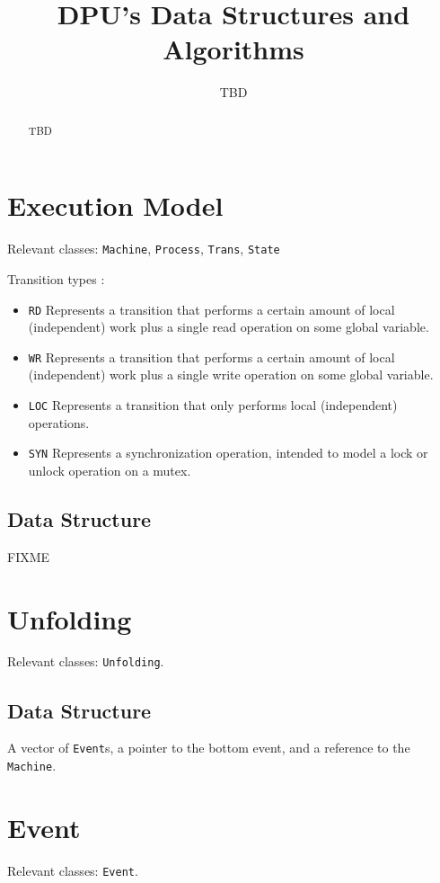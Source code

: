 \documentclass{llncs}
\title{DPU's Data Structures and Algorithms}
\author{TBD}
\institute{Université Paris 13, Sorbonne Paris Cité, LIPN, CNRS, France}
\begin{document}
\maketitle

\begin{abstract}
TBD
\end{abstract}

\section{Execution Model}
\label{s:model}

Relevant classes:
\verb!Machine!,
\verb!Process!,
\verb!Trans!,
\verb!State!

Transition types :
\begin{itemize}
\item
  \verb!RD! Represents a transition that performs a certain amount of
  local (independent) work plus a single read operation on some global variable.
\item
  \verb!WR! Represents a transition that performs a certain amount of
  local (independent) work plus a single write operation on some global variable.
\item
  \verb!LOC! Represents a transition that only performs local (independent)
  operations.
\item
  \verb!SYN! Represents a synchronization operation, intended to model a
  lock or unlock operation on a mutex.
\end{itemize}

\subsection{Data Structure}

FIXME

\section{Unfolding}

Relevant classes:
\verb!Unfolding!.

\subsection{Data Structure}

A vector of \verb!Event!s, a pointer to the bottom event, and a reference
to the \verb!Machine!.

\section{Event}
Relevant classes:
\verb!Event!.
\end{document}
